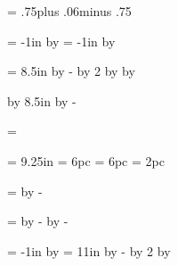 {{%
%
\parfillskip = .75\hsize plus .06\hsize minus .75\hsize


%
%
%
\oddoffset = -1in
\advance\oddoffset by \insidemargin
%
\evenoffset = -1in
\advance\evenoffset by \outsidemargin

%
\ifcenterpage
    = 8.5in
   \advance{} by -\totalwidth
   \divide{} by 2
   \advance\oddoffset by 
   \advance\evenoffset by 

%
\else
   \advance\evenoffset by 8.5in
   \advance\evenoffset by -\totalwidth
\fi

\hoffset = \oddoffset   %

%
\totalheight = 9.25in %
\topmargin = 6pc      %
\bottommargin = 6pc   %
\topskip = 2pc        %

\headmargin = \topmargin \advance \headmargin by -\topskip

\vsize = \totalheight
\advance \vsize by -\headmargin
\advance \vsize by -\bottommargin

\voffset = -1in %
\advance \voffset by \headmargin
\ifcenterpage
    = 11in
   \advance{} by -\totalheight
   \divide{} by 2
   \advance\voffset by 
\fi

}}
